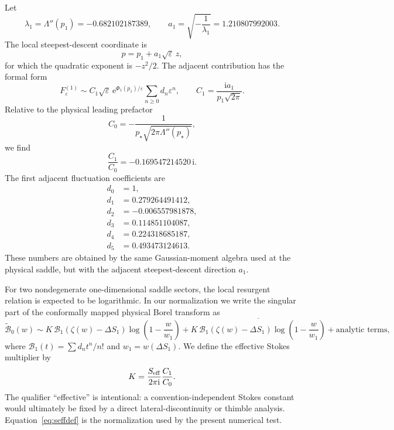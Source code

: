 \documentclass[11pt]{article}
\newcommand{\e}{\mathrm e}
\newcommand{\ii}{\mathrm i}
\newcommand{\calB}{\mathcal B}
\newcommand{\PhiH}{\Phi}
\begin{document}
Let
\begin{equation}
 \lambda_1=\Lambda''(p_1)=-0.682102187389,
 \qquad
 a_1=\sqrt{-\frac{1}{\lambda_1}}=1.210807992003.
\end{equation}
The local steepest-descent coordinate is
\begin{equation}
 p=p_1+a_1\sqrt\varepsilon\,z,
\end{equation}
for which the quadratic exponent is $-z^2/2$. The adjacent contribution has the formal form
\begin{equation}
 F^{(1)}_\varepsilon
 \sim C_1\sqrt\varepsilon\,
 \e^{\PhiH_1(p_1)/\varepsilon}
 \sum_{n\ge0}d_n\varepsilon^n,
 \qquad
 C_1=\frac{\ii a_1}{p_1\sqrt{2\pi}}.
 \label{eq:adjsector}
\end{equation}
Relative to the physical leading prefactor
\begin{equation}
 C_0=-\frac{1}{p_\star\sqrt{2\pi\Lambda''(p_\star)}},
\end{equation}
we find
\begin{equation}
 \frac{C_1}{C_0}=-0.169547214520\,\ii.
 \label{eq:prefactorratio}
\end{equation}
The first adjacent fluctuation coefficients are
\begin{align}
 d_0&=1,\nonumber\\
 d_1&=0.279264491412,\nonumber\\
 d_2&=-0.006557981878,\nonumber\\
 d_3&=0.114851104087,\nonumber\\
 d_4&=0.224318685187,\nonumber\\
 d_5&=0.493473124613.
 \label{eq:adjcoeffs}
\end{align}
These numbers are obtained by the same Gaussian-moment algebra used at the physical saddle, but with the adjacent steepest-descent direction $a_1$.

For two nondegenerate one-dimensional saddle sectors, the local resurgent relation is expected to be logarithmic. In our normalization we write the singular part of the conformally mapped physical Borel transform as
\begin{equation}
 \widetilde{\calB}_0(w)
 \sim K\,
 \calB_1\!\left(\zeta(w)-\Delta S_1\right)
 \log\!\left(1-\frac{w}{w_1}\right)
 +\overline{K\,
 \calB_1\!\left(\zeta(w)-\Delta S_1\right)
 \log\!\left(1-\frac{w}{w_1}\right)}
 +\text{analytic terms},
 \label{eq:stokeslocal}
\end{equation}
where $\calB_1(t)=\sum d_n t^n/n!$ and $w_1=w(\Delta S_1)$. We define the effective Stokes multiplier by
\begin{equation}
 K=\frac{S_{\rm eff}}{2\pi\ii}\frac{C_1}{C_0}.
 \label{eq:seffdef}
\end{equation}
The qualifier ``effective'' is intentional: a convention-independent Stokes constant would ultimately be fixed by a direct lateral-discontinuity or thimble analysis. Equation~\eqref{eq:seffdef} is the normalization used by the present numerical test.
\end{document}
